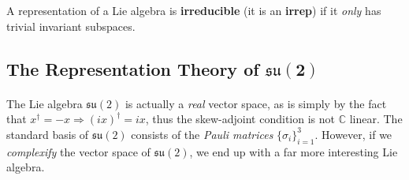 \documentclass[11pt,fleqn]{article}
\begin{document}
\begin{definition}
	A representation of a Lie algebra is \textbf{irreducible} (it is an \textbf{irrep}) if it \textit{only} has trivial invariant subspaces.
\end{definition}
	
\subsection{The Representation Theory of \texorpdfstring{$\boldsymbol{\mathfrak{su}(2)}$}{su(2)}}

\paragraph{} The Lie algebra $\mathfrak{su}(2)$ is actually a \textit{real} vector space, as is simply by the fact that $x^\dagger = -x \Rightarrow (ix)^\dagger = ix$, thus the skew-adjoint condition is not $\mathbb{C}$ linear. The standard basis of $\mathfrak{su}(2)$ consists of the \textit{Pauli matrices} $\{ \sigma_i \}_{i=1}^3$. However, if we \textit{complexify} the vector space of $\mathfrak{su}(2)$, we end up with a far more interesting Lie algebra.
\end{document}
